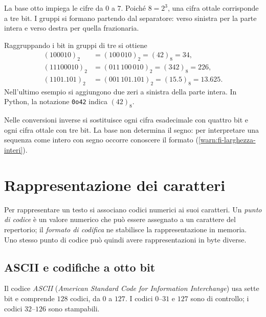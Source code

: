 La base otto impiega le cifre da \(0\) a \(7\). Poiché \(8=2^3\),
una cifra ottale corrisponde a tre bit. I gruppi si formano
partendo dal separatore: verso sinistra per la parte intera e verso
destra per quella frazionaria.

\clearpage

\begin{example}
Raggruppando i bit in gruppi di tre si ottiene
\begin{align*}
  (100010)_2&=(100\,010)_2=(42)_8=34,\\
  (11100010)_2&=(011\,100\,010)_2=(342)_8=226,\\
  (1101.101)_2&=(001\,101.101)_2=(15.5)_8=13.625.
\end{align*}
Nell'ultimo esempio si aggiungono due zeri a sinistra della parte
intera. In Python, la notazione \texttt{0o42} indica
\((42)_8\).
\end{example}

Nelle conversioni inverse si sostituisce ogni cifra esadecimale con
quattro bit e ogni cifra ottale con tre bit. La base non determina
il segno: per interpretare una sequenza come intero con segno occorre
conoscere il formato (\cref{warn:fi-larghezza-interi}).

\section{Rappresentazione dei caratteri}
\label{sec:fi-caratteri}

Per rappresentare un testo si associano codici numerici ai suoi
caratteri. Un \emph{punto di codice} è un valore numerico che può
essere assegnato a un carattere del repertorio; il
\emph{formato di codifica} ne stabilisce la rappresentazione in
memoria. Uno stesso punto di codice può quindi avere
rappresentazioni in byte diverse.

\subsection{ASCII e codifiche a otto bit}

Il codice \emph{ASCII} (\emph{American Standard Code for Information
Interchange}) usa sette bit e comprende \(128\) codici, da \(0\) a
\(127\). I codici \(0\)--\(31\) e \(127\) sono di controllo;
i codici \(32\)--\(126\) sono stampabili.

